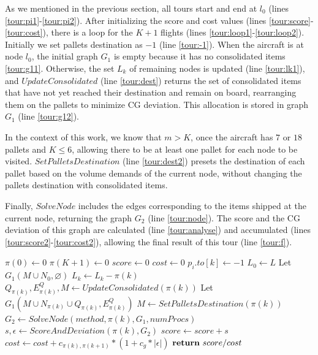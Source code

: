\documentclass[preprint,authoryear]{elsarticle}
\begin{document}
As we mentioned in the previous section, all tours start and end at $l_0$\/ (lines \ref{tour:pi1}-\ref{tour:pi2}).
After initializing the score and cost values (lines \ref{tour:score}-\ref{tour:cost}), there is a loop for the $K+1$\/ flights (lines \ref{tour:loop1}-\ref{tour:loop2}). Initially we set pallets destination as $-1$\/ (line \ref{tour:-1}). When the aircraft is at node $l_0$, the initial graph $G_1$\/ is empty because it has no consolidated items \ref{tour:g11}. Otherwise, the set $L_k$\/ of remaining nodes is updated (line \ref{tour:lk1}), and $UpdateConsolidated$\/ (line \ref{tour:dest}) returns the set of consolidated items that have not yet reached their destination and remain on board, rearranging them on the pallets to minimize CG deviation. This allocation is stored in graph $G_1$\/ (line \ref{tour:g12}).

In the context of this work, we know that $m>K$, once the aircraft has $7$\/ or $18$\/ pallets and $K\leq 6$, allowing there to be at least one pallet for each node to be visited. $SetPalletsDestination$\/ (line \ref{tour:dest2}) presets the destination of each pallet based on the volume demands of the current node, without changing the pallets destination with consolidated items.

Finally, $SolveNode$\/ includes the edges corresponding to the items shipped at the current node, returning the graph $G_2$\/ (line \ref{tour:node}). The score and the CG deviation of this graph are calculated (line \ref{tour:analyse}) and accumulated (lines \ref{tour:score2}-\ref{tour:cost2}), allowing the final result of this tour (line \ref{tour:f}).

\begin{algorithm}[H]
	\caption{$SolveTour(\pi, L, M, C, N, method, numProcs)$}  \label{alg:tour}
	
	\begin{algorithmic}[1]
		
		\State $\pi(0) \gets 0$ \label{tour:pi1}
		\State $\pi(K+1) \gets 0$ \label{tour:pi2}
		\State $score \gets 0$ \label{tour:score}
		\State $cost \gets 0$ \label{tour:cost}
		 \label{tour:loop1}		
				\State $p_i.to[k] \gets -1$ \label{tour:-1}
			\EndFor	
				\State $L_0 \gets L$
				\State Let $G_1(M \cup N_0, \varnothing)$ \label{tour:g11}
			\Else
				\State $L_k \gets L_k - \pi(k)$  \label{tour:lk1}			
				\State $Q_{\pi(k)}, E^Q_{\pi(k)}, M \gets UpdateConsolidated(\pi(k))$ \label{tour:dest}			
				\State Let $G_1(M \cup N_{\pi(k)} \cup Q_{\pi(k)}, E^Q_{\pi(k)})$ \label{tour:g12}
			\EndIf  \label{tour:lk2}	
			\State $M \gets SetPalletsDestination( \pi(k) )$ \label{tour:dest2}		
			\State $G_2 \gets SolveNode(method, \pi(k), G_1, numProcs)$ \label{tour:node}
			\State $s, \epsilon \gets ScoreAndDeviation(\pi(k), G_2)$ \label{tour:analyse}
			\State $score \gets score + s$ \label{tour:score2}
			\State $cost \gets cost + c_{\pi(k),\pi(k+1)} * (1 + c_g * |\epsilon|)$ \label{tour:cost2} 
		\EndFor  \label{tour:loop2}
		\State $ {\bf return}\ score / cost$ \label{tour:f}
		
	\end{algorithmic}
\end{algorithm}
\end{document}
